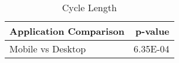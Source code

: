 \begin{table}[ht]
\centering
\caption{Cycle Length} 
\begin{tabular}{lr}
  \hline
Application Comparison & p-value \\ 
  \hline
Mobile vs Desktop & 6.35E-04 \\ 
   \hline
\end{tabular}
\label{tab:shortcycles}
\end{table}
